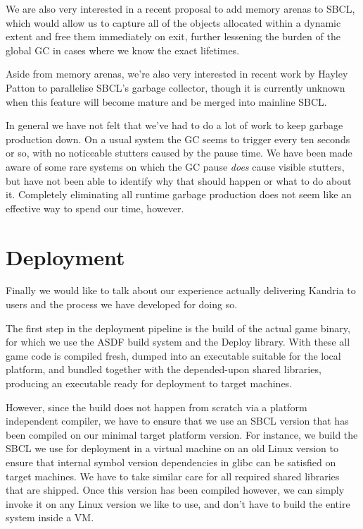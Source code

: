 \documentclass[format=sigconf]{acmart}
\begin{document}
We are also very interested in a recent proposal to add memory arenas to SBCL, which would allow us to capture all of the objects allocated within a dynamic extent and free them immediately on exit, further lessening the burden of the global GC in cases where we know the exact lifetimes.

Aside from memory arenas, we're also very interested in recent work by Hayley Patton to parallelise SBCL's garbage collector, though it is currently unknown when this feature will become mature and be merged into mainline SBCL.

In general we have not felt that we've had to do a lot of work to keep garbage production down. On a usual system the GC seems to trigger every ten seconds or so, with no noticeable stutters caused by the pause time. We have been made aware of some rare systems on which the GC pause \textit{does} cause visible stutters, but have not been able to identify why that should happen or what to do about it. Completely eliminating all runtime garbage production does not seem like an effective way to spend our time, however.

\section{Deployment}\label{deployment}
Finally we would like to talk about our experience actually delivering Kandria to users and the process we have developed for doing so.

The first step in the deployment pipeline is the build of the actual game binary, for which we use the ASDF build system and the Deploy\cite{deploy} library. With these all game code is compiled fresh, dumped into an executable suitable for the local platform, and bundled together with the depended-upon shared libraries, producing an executable ready for deployment to target machines.

However, since the build does not happen from scratch via a platform independent compiler, we have to ensure that we use an SBCL version that has been compiled on our minimal target platform version. For instance, we build the SBCL we use for deployment in a virtual machine on an old Linux version to ensure that internal symbol version dependencies in glibc can be satisfied on target machines. We have to take similar care for all required shared libraries that are shipped. Once this version has been compiled however, we can simply invoke it on any Linux version we like to use, and don't have to build the entire system inside a VM.
\end{document}
